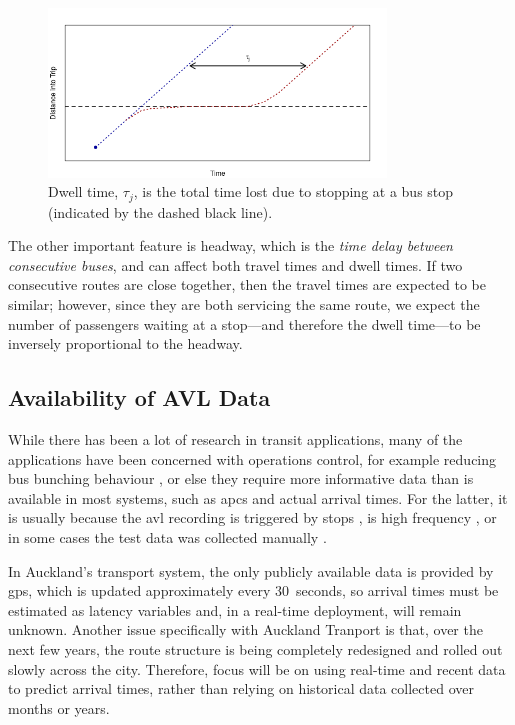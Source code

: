 \documentclass[12pt,a4paper]{article}
\begin{document}
\begin{figure}[bt]
  \centering
  \includegraphics[width=0.8\textwidth]{dwell_time.png}
  \caption{Dwell time, $\tau_j$, is the total time lost due to stopping at a bus stop (indicated by the dashed black line).}
  \label{fig:dwell-time}
\end{figure}

The other important feature is headway,
which is the \emph{time delay between consecutive buses},
and can affect both travel times and dwell times.
If two consecutive routes are close together,
then the travel times are expected to be similar;
however, since they are both servicing the same route,
we expect the number of passengers waiting at a stop---and therefore
the dwell time---to be inversely proportional to the headway.





\subsection{Availability of AVL Data}
\label{sec:data-types}

While there has been a lot of research in transit applications,
many of the applications have been concerned with operations control,
for example reducing bus bunching behaviour \citep{hans-etal:2015},
or else they require more informative data than is available in most systems,
such as \glspl{apc} and actual arrival times.
For the latter, it is usually because the \gls{avl} recording is triggered by stops
\citep{hans-etal:2015},
is high frequency \citep{chang-etal:2010},
or in some cases the test data was collected manually
\citep{yu-etal:2010}.


In Auckland's transport system, the only publicly available data is provided
by \gls{gps}, which is updated approximately every 30~seconds,
so arrival times must be estimated as latency variables and,
in a real-time deployment, will remain unknown.
Another issue specifically with Auckland Tranport is that,
over the next few years,
the route structure is being completely redesigned
and rolled out slowly across the city.
Therefore, focus will be on using real-time and recent data to predict arrival times,
rather than relying on historical data collected over months or years.
\end{document}
